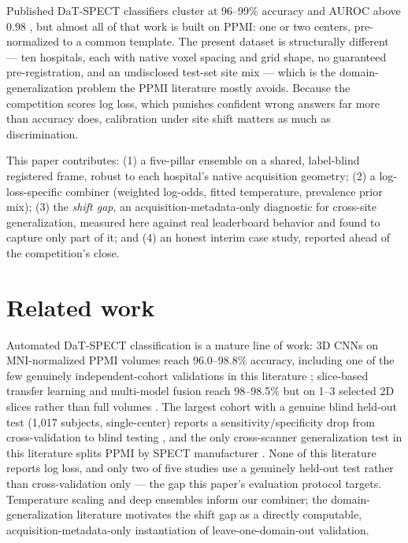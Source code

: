 \documentclass{article}
\begin{document}
Published DaT-SPECT classifiers cluster at 96--99\% accuracy and AUROC above 0.98 \cite{choi2017,quan2019,ensemblefusion2022}, but almost all of that work is built on PPMI: one or two centers, pre-normalized to a common template. The present dataset is structurally different --- ten hospitals, each with native voxel spacing and grid shape, no guaranteed pre-registration, and an undisclosed test-set site mix --- which is the domain-generalization problem the PPMI literature mostly avoids. Because the competition scores log loss, which punishes confident wrong answers far more than accuracy does, calibration under site shift matters as much as discrimination.

This paper contributes: (1) a five-pillar ensemble on a shared, label-blind registered frame, robust to each hospital's native acquisition geometry; (2) a log-loss-specific combiner (weighted log-odds, fitted temperature, prevalence prior mix); (3) the \emph{shift gap}, an acquisition-metadata-only diagnostic for cross-site generalization, measured here against real leaderboard behavior and found to capture only part of it; and (4) an honest interim case study, reported ahead of the competition's close.

\section{Related work}
\label{sec:related}

Automated DaT-SPECT classification is a mature line of work: 3D CNNs on MNI-normalized PPMI volumes reach 96.0--98.8\% accuracy, including one of the few genuinely independent-cohort validations in this literature \cite{choi2017}; slice-based transfer learning and multi-model fusion reach 98--98.5\% but on 1--3 selected 2D slices rather than full volumes \cite{quan2019,ensemblefusion2022}. The largest cohort with a genuine blind held-out test (1{,}017 subjects, single-center) reports a sensitivity/specificity drop from cross-validation to blind testing \cite{zhao2022}, and the only cross-scanner generalization test in this literature splits PPMI by SPECT manufacturer \cite{radiomics2022}. None of this literature reports log loss, and only two of five studies use a genuinely held-out test rather than cross-validation only --- the gap this paper's evaluation protocol targets. Temperature scaling \cite{guo2017} and deep ensembles \cite{lakshminarayanan2017} inform our combiner; the domain-generalization literature \cite{gulrajani2021} motivates the shift gap as a directly computable, acquisition-metadata-only instantiation of leave-one-domain-out validation.
\end{document}

